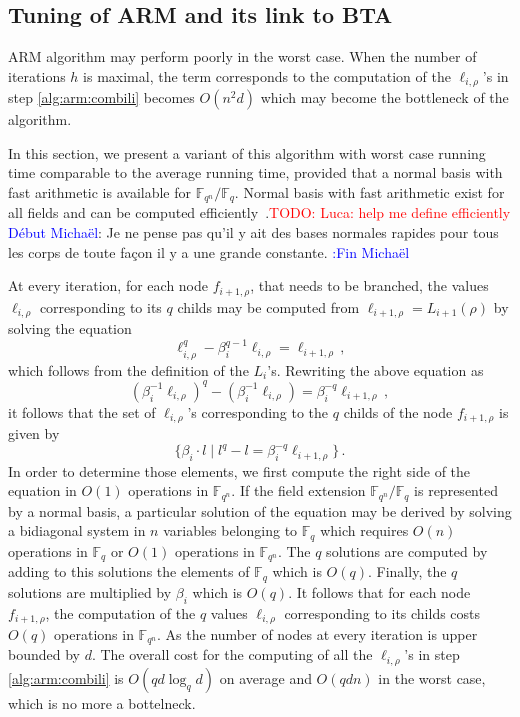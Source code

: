 \documentclass{sig-alternate}
\newcommand{\ff}[1]{\mathbb{F}_{#1}}
\newcommand{\dd}{d}
\newcommand{\qq}{q}
\newcommand{\nn}{n}
\newcommand{\qn}{{\qq^\nn}}
\newcommand{\basef}{\ff{\qq}}
\newcommand{\extf}{\ff{\qn}}
\newcommand{\bigO}{O}
\newcounter{algo}
\newcommand{\todo}[1]{\textcolor{red}{TODO: #1}}
\newcommand{\comd}{\noindent \textcolor{blue}{D\'ebut Micha\"el}:}
\newcommand{\comf}{\noindent \textcolor{blue}{:Fin Micha\"el}}
\begin{document}
\subsection{Tuning of ARM and its link to BTA}
 
 
 \medskip
 
 ARM algorithm may perform poorly in the worst case. When the number of iterations $h$ is maximal, 
the term corresponds to the computation of the $\ell_{i,\rho}$'s in step \ref{alg:arm:combili} becomes $\bigO(\nn^2 \dd)$ which may become the bottleneck of the algorithm. 

In this section, we present a variant of this algorithm with worst case running time comparable to the average running time, provided that a normal basis with fast arithmetic is available for $\extf/\basef$. 
Normal basis with fast arithmetic exist for all fields and can be computed efficiently~\cite{Couveignes-Lercier}.\todo{Luca: help me define efficiently}
\comd
Je ne pense pas qu'il y ait des bases normales rapides pour tous les corps de toute fa\c{c}on il y a une grande constante. 
\comf

At every iteration, for each node $f_{i+1,\rho}$, that needs to be branched, the values $\ell_{i,\rho}$ corresponding to its $\qq$ childs may be computed from $\ell_{i+1,\rho}=L_{i+1}(\rho)$ by solving the equation  
$$\ell_{i,\rho}^q-\beta_i^{\qq-1} \ell_{i,\rho}=\ell_{i+1,\rho}\,,$$
which follows from the definition of the $L_i$'s. Rewriting the above equation as 
$$(\beta_i^{-1}\ell_{i,\rho})^q-(\beta_i^{-1}\ell_{i,\rho})=\beta_i^{-q}\ell_{i+1,\rho}\,,$$
it follows that the set of $\ell_{i,\rho}$'s corresponding to the $\qq$ childs of the node $f_{i+1,\rho}$ is given by 
$$\{ \beta_i \cdot l \mid l^q-l=\beta_i^{-q}\ell_{i+1,\rho} \} \,.$$
In order to determine those elements, we first compute the right side of the equation in $O(1)$ operations in $\extf$. If the field extension $\extf/\basef$ is represented by a normal basis, a particular solution of the equation may be derived by solving a bidiagonal system in $n$ variables belonging to $\basef$ which requires $\bigO(\nn)$ operations in $\basef$ or $O(1)$ operations in $\extf$. The $\qq$ solutions are computed by adding to this solutions the elements of $\basef$ which is $\bigO(\qq)$.    Finally, the $\qq$ solutions are multiplied by $\beta_i$ which is $\bigO(q)$. It follows that for each node $f_{i+1,\rho}$, the computation of the $\qq$ values $\ell_{i,\rho}$ corresponding to its childs costs $\bigO(q)$ operations in $\extf$. As the number of nodes at every iteration is upper bounded by $\dd$. The overall cost for the computing of all the $\ell_{i,\rho}$'s in step \ref{alg:arm:combili}  is $O(\qq \dd \log_\qq \dd)$ on average and $O(\qq \dd \nn)$ in the worst case, which is no more a bottelneck.
\end{document}
